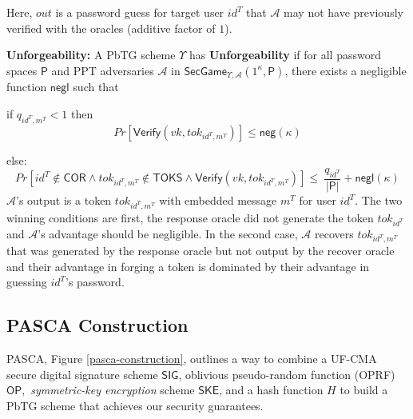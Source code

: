 \documentclass[conference]{IEEEtran}
\newcommand{\cA}{\mathcal{A}}
\newcommand{\secparameter}{\kappa}
\newcommand{\vk}{vk}
\newcommand{\uid}{id}
\newcommand{\sP}{\mathsf{P}}
\begin{document}
     Here, $out$ is a password guess for target user $\uid^{T}$ that $\cA$ may not have previously verified with the oracles (additive factor of $1$).
    
    \noindent
    {\bf Unforgeability:}\label{def:unforge_PbTG}
    A PbTG scheme $\Upsilon$ has \textbf{Unforgeability} if for all password spaces $\sP$ and PPT adversaries $\cA$ in $\mathsf{SecGame}_{\Upsilon,\cA}(1^{\secparameter},\sP)$, there exists a negligible function $\mathsf{negl}$ such that
    
    if $q_{\uid^{T},m^{T}} < 1$ then 
    \[Pr[\mathsf{Verify}(\vk,tok_{\uid^{T},m^{T}})] \leq \mathsf{neg}(\secparameter)\]
    
    else:
    \[Pr[ \uid^{T} \notin \mathsf{COR} \land tok_{\uid^{T},m^{T}} \notin \mathsf{TOKS} \land \mathsf{Verify}(\vk,tok_{\uid^{T},m^{T}})] \leq ~ \frac{q_{\uid^{T}}}{|\sP|} + \mathsf{negl}(\secparameter)\]
    $\cA$'s output is a token $tok_{\uid^{T},m^{T}}$ with embedded message $m^{T}$ for user $\uid^{T}$. The two winning conditions are first, the response oracle did not generate the token $tok_{\uid^{T}}$ and $\cA$'s advantage should be negligible. In the second case, $\cA$ recovers $tok_{\uid^{T},m^{T}}$ that was generated by the response oracle but not output by the recover oracle and their advantage in forging a token is dominated by their advantage in guessing $\uid^{T}$'s password.

    

\subsection{PASCA Construction}
 
PASCA, Figure \ref{pasca-construction}, outlines a way to combine a UF-CMA secure digital signature scheme $\mathsf{SIG}$, oblivious pseudo-random function (OPRF) $\mathsf{OP},$ %
{\em  symmetric-key encryption} scheme $\mathsf{SKE}$, and a hash function $H$ to build a PbTG scheme that achieves our security guarantees.
\end{document}
